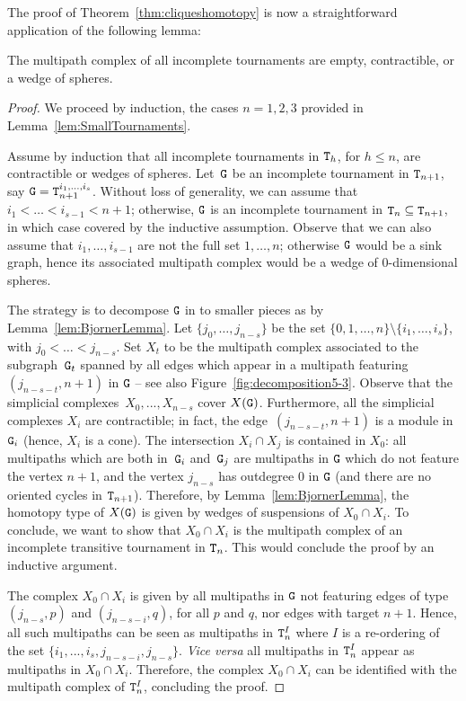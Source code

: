 \documentclass{amsart}
\newcommand{\CC}[1]{\textcolor{princetonorange}{#1}}
\begin{document}
The proof of Theorem~\ref{thm:cliqueshomotopy} is now a straightforward application of the following lemma:

\begin{lem}\label{lem:inCompleteTour}
The multipath complex of all incomplete tournaments are empty, contractible, or a wedge of spheres.
\end{lem}

\begin{proof}
We proceed by induction, the cases $n=1,2, 3$ provided in Lemma~\ref{lem:SmallTournaments}.

Assume by induction that all incomplete tournaments in ${\tt T}_h$, for $h\leq n$, are contractible or wedges of spheres. Let~${\tt G}$ be an incomplete tournament in ${\tt T}_{n+1}$, say ${\tt G}={\tt T}_{n+1}^{i_1, \dots, i_s}$. Without loss of generality, we can assume that $i_1< \dots < i_{s-1} < {n+1}$;  otherwise, ${\tt G}$ is an incomplete tournament in ${\tt T}_{n} \subseteq {\tt T}_{n+1}$, in which case covered by the inductive assumption.  Observe that we can also assume that $i_1, \dots , i_{s-1} $ are not the full set $1,\dots , n$; otherwise ${\tt G}$ would be a sink graph, hence its associated multipath complex would be a wedge of $0$-dimensional spheres. 

The strategy is to decompose ${\tt G}$ in to smaller pieces as by Lemma~\ref{lem:BjornerLemma}. Let $\{j_0, \dots, j_{n-s}\} $ be the set $  \{ 0, 1 ,\dots, n\} \setminus \{ i_1,\dots,i_s\}$, with $j_0 < \dots < j_{n-s}$. Set $X_t$ to be the multipath complex associated to the subgraph~${\tt G}_t$ spanned by all edges which appear in a multipath featuring $(j_{n-s -t},n+1)$ in ${\tt G}$  -- see also Figure~\ref{fig:decomposition5-3}. Observe that the simplicial complexes~$X_0,...,X_{n-s}$ cover $X({\tt G})$. Furthermore, all the simplicial complexes $X_i$ are contractible; in fact, the edge~$(j_{n-s -t},n+1)$ is a module in ${\tt G}_i$ (hence, $X_i$ is a cone). The intersection $X_i\cap X_j$ is contained in $X_0$: all multipaths which are both in~${\tt G}_i$ and~${\tt G}_j$ are multipaths in ${\tt G}$ which do not feature the vertex $n+1$, and the vertex $j_{n-s}$ has outdegree $0$ in ${\tt G}$ (and there are no oriented cycles in ${\tt T}_{n+1}$). Therefore, by Lemma~\ref{lem:BjornerLemma}, the homotopy type of $X({\tt G})$ is given by wedges of suspensions of $X_0\cap X_i$. To conclude, we want to show that $X_0\cap X_i$ is the multipath complex of an incomplete transitive tournament in ${\tt T}_n$. This would conclude the proof by an inductive argument.

The complex $X_0\cap X_i$ is given by all multipaths in ${\tt G}$ not featuring edges of type $(j_{n-s},p)$ and $(j_{n-s-i},q)$, for all $p$ and $q$, nor edges with target $n+1$. Hence, all such multipaths can be seen as multipaths in ${\tt T}_{n}^I$ where $I$ is a re-ordering of the set $\{ i_1,...,i_s,j_{n -s - i},j_{n-s}\}$. \emph{Vice versa} all multipaths in ${\tt T}_{n}^I$ appear as multipaths in $X_0\cap X_i$. Therefore, the complex $X_0\cap X_i$
can  be identified with the multipath complex of ${\tt T}_{n}^I$, concluding the proof.
\end{proof}
\end{document}
